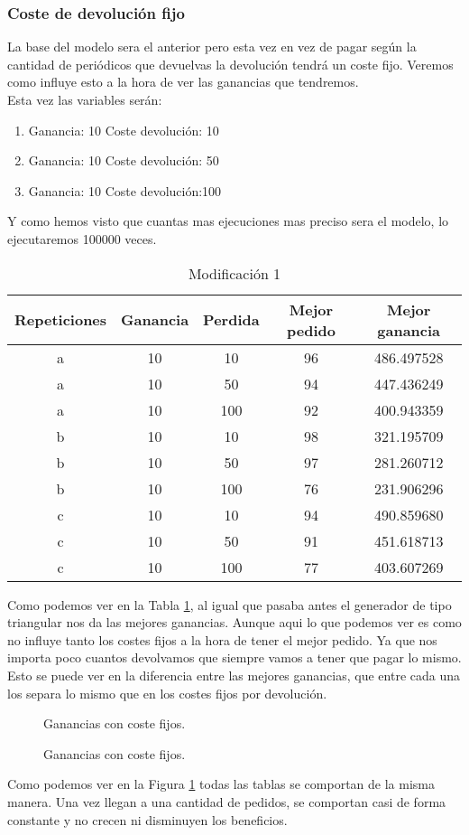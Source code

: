 \documentclass[12pt,a4paper]{article}
\begin{document}
\subsubsection{Coste de devolución fijo}
La base del modelo sera el anterior pero esta vez en vez de pagar según la cantidad de periódicos que devuelvas la devolución tendrá un coste fijo. Veremos como influye esto a la hora de ver las ganancias que tendremos. \\ Esta vez las variables serán:
\begin{enumerate}
	\item Ganancia: 10 Coste devolución: 10
	\item Ganancia: 10 Coste devolución: 50
	\item Ganancia: 10 Coste devolución:100
\end{enumerate}
Y como hemos visto que cuantas mas ejecuciones mas preciso sera el modelo, lo ejecutaremos 100000 veces.
\begin{table}[H]
	\begin{tabular}{ccccc} \toprule
		{Repeticiones} & {Ganancia} & {Perdida} &  {Mejor pedido} & {Mejor ganancia} \\ \midrule
		a &10  & 10 & 96 & 486.497528 \\
		a &10  & 50  & 94 & 447.436249\\
		a &10  & 100 & 92 & 400.943359 \\
		\midrule
		b &10  & 10 & 98 & 321.195709 \\
		b &10  & 50 & 97 & 281.260712 \\
		b &10  & 100 & 76 & 231.906296 \\  
		\midrule
		c &10  & 10& 94 & 490.859680\\
		c &10  & 50& 91 & 451.618713 \\
		c &10  & 100& 77 & 403.607269 \\
		\midrule	
	\end{tabular}
	\caption{Modificación 1} \label{tab:mod1}
\end{table}
Como podemos ver en la Tabla \ref{tab:mod1}, al igual que pasaba antes el generador de tipo triangular nos da las mejores ganancias.  Aunque aqui lo que podemos ver es como no influye tanto los costes fijos a la hora de tener el mejor pedido. Ya que nos importa poco cuantos devolvamos que siempre vamos a tener que pagar lo mismo. Esto se puede ver en la diferencia entre las mejores ganancias, que entre cada una los separa lo mismo que en los costes fijos por devolución. 
\begin{figure}[H]
	\centering
		\caption{Ganancias con coste fijos.}
	\caption{Ganancias con coste fijos.}
	\label{f:mod1}
\end{figure}
Como podemos ver en la Figura \ref{f:mod1} todas las tablas se comportan de la misma manera. Una vez llegan a una cantidad de pedidos, se comportan casi de forma constante y no crecen ni disminuyen los beneficios. 
\end{document}
